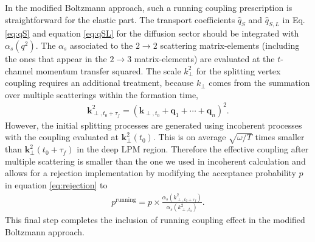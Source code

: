 \documentclass[aps, prc, reprint, amsmath, groupedaddress, nofootinbib]{revtex4-1}
\begin{document}
In the modified Boltzmann approach, such a running coupling prescription is straightforward for the elastic part.
The transport coefficients $\hat{q}_S$ and $\hat{q}_{S, L}$ in Eq. \ref{eq:qS} and equation \ref{eq:qSL} for the diffusion sector should be integrated with $\alpha_s(q^2)$.
The $\alpha_s$ associated to the $2\rightarrow 2$ scattering matrix-elements (including the ones that appear in the $2\rightarrow 3$ matrix-elements) are evaluated at the $t$-channel momentum transfer squared.
The scale $k_\perp^2$ for the splitting vertex coupling requires an additional treatment, because $k_\perp$ comes from the summation over multiple scatterings within the formation time,
\begin{eqnarray}\label{eq:kTn}
\mathbf{k}_{\perp, t_0+\tau_f}^2 = \left(\mathbf{k}_{\perp,t_0}+\mathbf{q}_1+\cdots+\mathbf{q}_n\right)^2.
\end{eqnarray} 
However, the initial splitting processes are generated using incoherent processes with the coupling evaluated at $\mathbf{k}_{\perp}^2(t_0)$.
This is on average $\sqrt{\omega/T}$ times smaller than $\mathbf{k}_{\perp}^2(t_0+\tau_f)$ in the deep LPM region.
Therefore the effective coupling after multiple scattering is smaller than the one we used in incoherent calculation and allows for a rejection implementation by modifying the acceptance probability $p$ in equation \ref{eq:rejection} to
\begin{eqnarray}
p^{\textrm{running}} = p\times \frac{\alpha_s(k_{\perp,t_0+\tau_f}^2)}{\alpha_s(k_{\perp,t_0}^2)}.
\end{eqnarray}
This final step completes the inclusion of running coupling effect in the modified Boltzmann approach.
\end{document}
